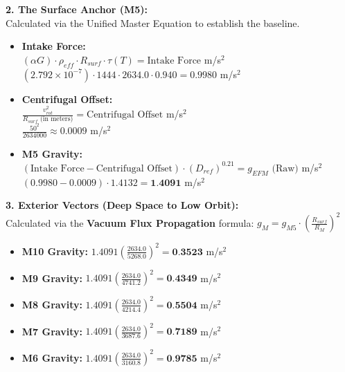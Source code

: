 \documentclass[11pt, a4paper]{article}
\begin{document}
  \vspace{1.0em}
  \noindent \textbf{2. The Surface Anchor (M5):} \\
  \hspace*{1em} Calculated via the Unified Master Equation to establish the baseline.
  \begin{itemize}
    \item \textbf{Intake Force:} \\[0.5em]
    \hspace*{2em} $(\alpha G) \cdot \rho_{eff} \cdot R_{surf} \cdot \tau(T) = \text{Intake Force}$ m/s$^2$ \\[1em]
    \hspace*{2em} $(2.792 \times 10^{-7}) \cdot 1444 \cdot 2634.0 \cdot 0.940 = 0.9980$ m/s$^2$
    
    \item \textbf{Centrifugal Offset:} \\[0.5em]
    \hspace*{2em} $\frac{v_{rot}^2}{R_{surf} \text{ (in meters)}} = \text{Centrifugal Offset}$ m/s$^2$ \\[1em]
    \hspace*{2em} $\frac{50^2}{2634000} \approx 0.0009$ m/s$^2$
    
    \item \textbf{M5 Gravity:} \\[0.5em]
    \hspace*{2em} $(\text{Intake Force} - \text{Centrifugal Offset}) \cdot (D_{ref})^{0.21} = g_{EFM} \text{ (Raw)}$ m/s$^2$ \\[1em]
    \hspace*{2em} $(0.9980 - 0.0009) \cdot 1.4132 = \textbf{1.4091}$ m/s$^2$
  \end{itemize}

  \clearpage
  \noindent \textbf{3. Exterior Vectors (Deep Space to Low Orbit):} \\
  \hspace*{1em} Calculated via the \textbf{Vacuum Flux Propagation} formula: $g_M = g_{M5} \cdot \left( \frac{R_{surf}}{R_M} \right)^2$
  \begin{itemize}
    \item \textbf{M10 Gravity:} $1.4091 \left( \frac{2634.0}{5268.0} \right)^2 = \textbf{0.3523}$ m/s$^2$
    \item \textbf{M9 Gravity:} $1.4091 \left( \frac{2634.0}{4741.2} \right)^2 = \textbf{0.4349}$ m/s$^2$
    \item \textbf{M8 Gravity:} $1.4091 \left( \frac{2634.0}{4214.4} \right)^2 = \textbf{0.5504}$ m/s$^2$
    \item \textbf{M7 Gravity:} $1.4091 \left( \frac{2634.0}{3687.6} \right)^2 = \textbf{0.7189}$ m/s$^2$
    \item \textbf{M6 Gravity:} $1.4091 \left( \frac{2634.0}{3160.8} \right)^2 = \textbf{0.9785}$ m/s$^2$
  \end{itemize}
\end{document}
